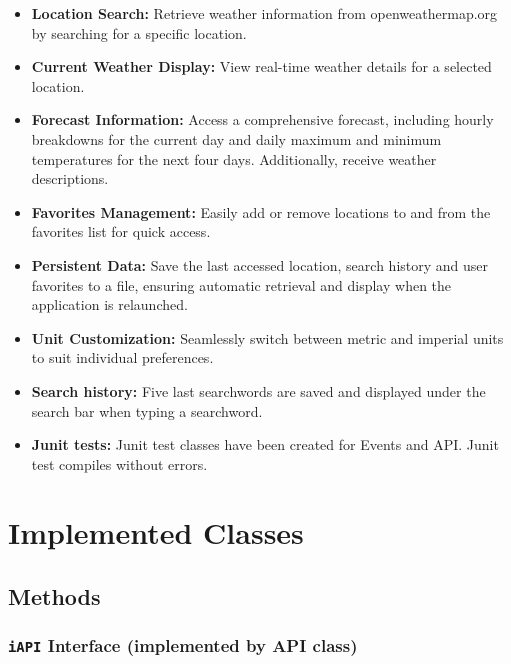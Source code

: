 \documentclass[a4paper,10pt]{article}
\begin{document}
\begin{itemize}
	\item \textbf{Location Search:} Retrieve weather information from openweathermap.org by searching for a specific location.
	\item \textbf{Current Weather Display:} View real-time weather details for a selected location.
	\item \textbf{Forecast Information:} Access a comprehensive forecast, including hourly breakdowns for the current day and daily maximum and minimum temperatures for the next four days. Additionally, receive weather descriptions.
	\item \textbf{Favorites Management:} Easily add or remove locations to and from the favorites list for quick access.
	\item \textbf{Persistent Data:} Save the last accessed location, search history and user favorites to a file, ensuring automatic retrieval and display when the application is relaunched.
	\item \textbf{Unit Customization:} Seamlessly switch between metric and imperial units to suit individual preferences.
	\item \textbf{Search history:} Five last searchwords are saved and displayed under the search bar when typing a searchword.
	\item \textbf{Junit tests:} Junit test classes have been created for Events and API. Junit test compiles without errors.
\end{itemize}



\section{Implemented Classes}

\subsection*{Methods}

\subsubsection*{\texttt{iAPI} Interface (implemented by API class)}
\end{document}
